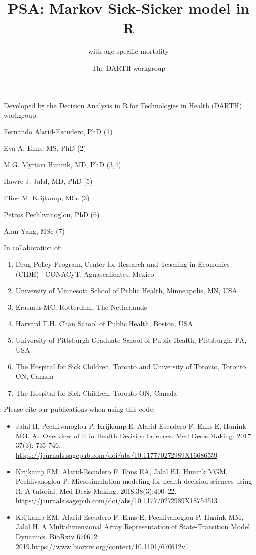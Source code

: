 \documentclass[]{article}
\title{PSA: Markov Sick-Sicker model in R}
\subtitle{with age-specific mortality}
\author{The DARTH workgroup}
\date{}
\providecommand{\tightlist}{%
  \setlength{\itemsep}{0pt}\setlength{\parskip}{0pt}}
\begin{document}
\maketitle

Developed by the Decision Analysis in R for Technologies in Health
(DARTH) workgroup:

Fernando Alarid-Escudero, PhD (1)

Eva A. Enns, MS, PhD (2)

M.G. Myriam Hunink, MD, PhD (3,4)

Hawre J. Jalal, MD, PhD (5)

Eline M. Krijkamp, MSc (3)

Petros Pechlivanoglou, PhD (6)

Alan Yang, MSc (7)

In collaboration of:

\begin{enumerate}
\def\labelenumi{\arabic{enumi}.}
\tightlist
\item
  Drug Policy Program, Center for Research and Teaching in Economics
  (CIDE) - CONACyT, Aguascalientes, Mexico
\item
  University of Minnesota School of Public Health, Minneapolis, MN, USA
\item
  Erasmus MC, Rotterdam, The Netherlands
\item
  Harvard T.H. Chan School of Public Health, Boston, USA
\item
  University of Pittsburgh Graduate School of Public Health, Pittsburgh,
  PA, USA
\item
  The Hospital for Sick Children, Toronto and University of Toronto,
  Toronto ON, Canada
\item
  The Hospital for Sick Children, Toronto ON, Canada
\end{enumerate}

Please cite our publications when using this code:

\begin{itemize}
\item
  Jalal H, Pechlivanoglou P, Krijkamp E, Alarid-Escudero F, Enns E,
  Hunink MG. An Overview of R in Health Decision Sciences. Med Decis
  Making. 2017; 37(3): 735-746.
  \url{https://journals.sagepub.com/doi/abs/10.1177/0272989X16686559}
\item
  Krijkamp EM, Alarid-Escudero F, Enns EA, Jalal HJ, Hunink MGM,
  Pechlivanoglou P. Microsimulation modeling for health decision
  sciences using R: A tutorial. Med Decis Making. 2018;38(3):400--22.
  \url{https://journals.sagepub.com/doi/abs/10.1177/0272989X18754513}
\item
  Krijkamp EM, Alarid-Escudero F, Enns E, Pechlivanoglou P, Hunink MM,
  Jalal H. A Multidimensional Array Representation of State-Transition
  Model Dynamics. BioRxiv 670612
  2019.\url{https://www.biorxiv.org/content/10.1101/670612v1}
\end{itemize}
\end{document}

